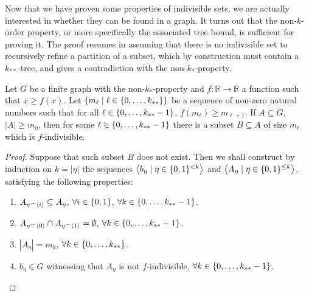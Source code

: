         Now that we have proven some properties of indivisible sets, we are actually interested in whether they can be
        found in a graph.
        It turns out that the non-$k$-order property, or more specifically the associated tree bound, is sufficient for
        proving it.
        The proof resumes in assuming that there is no indivisible set to recursively refine a partition of a subset,
        which by construction must contain a $k_{**}$-tree, and gives a contradiction with the non-$k_*$-property.

        \begin{lemma} \label{lem:existance_of_indivisible_sets}
            Let $G$ be a finite graph with the non-$k_*$-property and $f: \mathbb{R} \longrightarrow \mathbb{R}$ a function
            such that $x \geq f(x)$.
            Let $\{ m_\ell \mid \ell \in \{ 0, \dots, k_{**} \} \}$ be a sequence of non-zero natural numbers such that
            for all $\ell \in \{ 0, \dots, k_{**}-1 \}$, $f(m_{\ell}) \geq m_{\ell+1}$.
            If $A \subseteq G$, $|A| \geq m_0$, then for some $\ell \in \{ 0, \dots, k_{**}-1 \}$ there is a subset $B \subseteq A$
            of size $m_\ell$ which is $f$-indivisible.
            \begin{proof}
                Suppose that such subset $B$ does not exist.
                Then we shall construct by induction on $k = |\eta|$ the sequences $\left< b_\eta \mid \eta \in \{ 0,1 \}^{<k} \right>$
                and $\left< A_\eta \mid \eta \in \{ 0,1 \}^{\leq k} \right>$, satisfying the following properties:
                \begin{enumerate}
                    \item\label{itm:existance_of_indivisible_sets.1} $A_{\eta^\frown \left< i \right>} \subseteq A_{\eta}$, $\forall i \in \{ 0,1 \}$, $\forall k \in \{ 0, \dots, k_{**}-1 \}$.
                    \item\label{itm:existance_of_indivisible_sets.2} $A_{\eta^\frown \left< 0 \right>} \cap A_{\eta^\frown \left< 1 \right>} = \emptyset$, $\forall k \in \{ 0, \dots, k_{**}-1 \}$.
                    \item\label{itm:existance_of_indivisible_sets.3} $|A_\eta| = m_k$, $\forall k \in \{ 0, \dots, k_{**} \}$.
                    \item\label{itm:existance_of_indivisible_sets.4} $b_\eta \in G$ witnessing that $A_\eta$ is not $f$-indivisible, $\forall k \in \{ 0, \dots, k_{**}-1 \}$.

\end{enumerate}
\end{proof}
\end{lemma}
